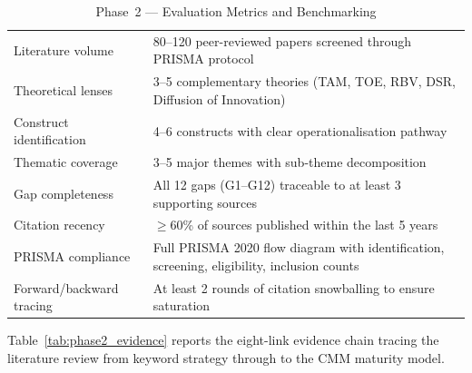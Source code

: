 \begingroup\singlespacing\tablefontsize\tablestripes
\begin{xltabular}{\textwidth}{@{} l X @{}}
\caption{Phase~2 --- Evaluation Metrics and Benchmarking}
\label{tab:phase2_benchmark}\\
\toprule
{} &  \\
\midrule
\endfirsthead
\endhead
\bottomrule
\endlastfoot
Literature volume             & 80--120 peer-reviewed papers screened through PRISMA protocol \\
\addlinespace
Theoretical lenses            & 3--5 complementary theories (TAM, TOE, RBV, DSR, Diffusion of Innovation) \\
\addlinespace
Construct identification      & 4--6 constructs with clear operationalisation pathway \\
\addlinespace
Thematic coverage             & 3--5 major themes with sub-theme decomposition \\
\addlinespace
Gap completeness              & All 12 gaps (G1--G12) traceable to at least 3 supporting sources \\
\addlinespace
Citation recency              & $\geq$60\% of sources published within the last 5 years \\
\addlinespace
PRISMA compliance             & Full PRISMA 2020 flow diagram with identification, screening, eligibility, inclusion counts \\
\addlinespace
Forward/backward tracing      & At least 2 rounds of citation snowballing to ensure saturation \\
\end{xltabular}
\endgroup

\vspace{1.5em}

Table~\ref{tab:phase2_evidence} reports the eight-link evidence chain tracing the literature review from keyword strategy through to the CMM maturity model.


